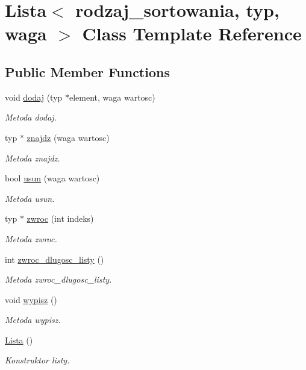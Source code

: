 \hypertarget{class_lista}{\section{Lista$<$ rodzaj\+\_\+sortowania, typ, waga $>$ Class Template Reference}
\label{class_lista}
}
\subsection*{Public Member Functions}
\begin{DoxyCompactItemize}
\item 
void \hyperlink{class_lista_a2f3ca0d9972aba022ec74b79307ca24a}{dodaj} (typ $\ast$element, waga wartosc)
\begin{DoxyCompactList}\small\item\em Metoda dodaj. \end{DoxyCompactList}\item 
typ $\ast$ \hyperlink{class_lista_a5dbc645df44c19d6aaaa6805ed0730b4}{znajdz} (waga wartosc)
\begin{DoxyCompactList}\small\item\em Metoda znajdz. \end{DoxyCompactList}\item 
bool \hyperlink{class_lista_a225a14d06207d4292332b21899cf6ca5}{usun} (waga wartosc)
\begin{DoxyCompactList}\small\item\em Metoda usun. \end{DoxyCompactList}\item 
typ $\ast$ \hyperlink{class_lista_a61d5b2dc687e7c96ddba9981d786496b}{zwroc} (int indeks)
\begin{DoxyCompactList}\small\item\em Metoda zwroc. \end{DoxyCompactList}\item 
int \hyperlink{class_lista_aa4123a294fb68e8e29aa17f1752812ea}{zwroc\+\_\+dlugosc\+\_\+listy} ()
\begin{DoxyCompactList}\small\item\em Metoda zwroc\+\_\+dlugosc\+\_\+listy. \end{DoxyCompactList}\item 
void \hyperlink{class_lista_ae468fc467f7934cc372eca819af48dbf}{wypisz} ()
\begin{DoxyCompactList}\small\item\em Metoda wypisz. \end{DoxyCompactList}\item 
\hypertarget{class_lista_abd5fb799a4c332a519aeca13e2f61281}{\hyperlink{class_lista_abd5fb799a4c332a519aeca13e2f61281}{Lista} ()}\label{class_lista_abd5fb799a4c332a519aeca13e2f61281}

\begin{DoxyCompactList}\small\item\em Konstruktor listy. \end{DoxyCompactList}\end{DoxyCompactItemize}


